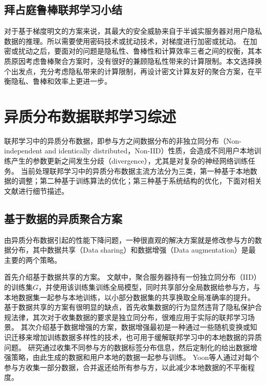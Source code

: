 \subsection{拜占庭鲁棒联邦学习小结}
对于基于梯度明文的方案来说，其最大的安全威胁来自于半诚实服务器对用户隐私数据的推理\cite{geiping2020inverting}。所以需要使用密码技术或扰动技术，对梯度进行加密或扰动。
在加密或扰动之后，要面对的问题是隐私性、鲁棒性和计算效率三者之间的权衡，其本质原因考虑鲁棒聚合方案时，没有很好的兼顾隐私性带来的计算限制。本文选择换个出发点，充分考虑隐私带来的计算限制，再设计密文计算友好的聚合方案，在平衡隐私、鲁棒和效率上更进一步。

\section{异质分布数据联邦学习综述}
\label{sec:noniid}
联邦学习中的异质分布数据，即参与方之间数据分布的非独立同分布（Non-independent and identically distributed，Non-IID）性质，会造成不同用户本地训练产生的参数更新之间发生分歧（divergence），尤其是对复杂的神经网络训练任务。
当前处理联邦学习中的异质分布数据主流方法分为三类，第一种基于本地数据的调整；第二种基于训练算法的优化；第三种基于系统结构的优化，下面对相关文献进行细节描述。

\subsection{基于数据的异质聚合方案}
由异质分布数据引起的性能下降问题，一种很直观的解决方案就是修改参与方的数据分布，其中数据共享（Data sharing）和数据增强（Data augmentation）\cite{tanner1987calculation}是最主要的两个策略。

首先介绍基于数据共享的方案\cite{zhao2018federated, yoshida2020hybrid, tuor2021overcoming}。
文献\cite{zhao2018federated}中，聚合服务器持有一份独立同分布（IID）的训练集$G$，并使用该训练集训练全局模型，同时共享部分全局数据给参与方，与本地数据集一起参与本地训练，以小部分数据集的共享换取全局准确率的提升。
基于数据共享的方案有很明显的缺点，首先收集数据的行为显然违背了隐私保护合规法律，其次对于收集数据的要求是独立同分布，很难应用于实际的联邦学习场景。
其次介绍基于数据增强的方案\cite{duan2019astraea, shin2020xor, yoonfedmix}，数据增强\cite{tanner1987calculation}最初是一种通过一些随机变换或知识迁移来增加训练数据多样性的技术，也可用于缓解联邦学习中的本地数据的异质问题。
研究\cite{duan2019astraea}通过收集不同参与方的数据标签分布信息，然后定制化的给出数据增强策略，由此生成的数据和用户本地的数据一起参与训练。
Yoon等人\cite{yoonfedmix}通过对每个参与方收集一部分数据，合并返还给所有参与方，以此减少本地数据的不平衡程度。

